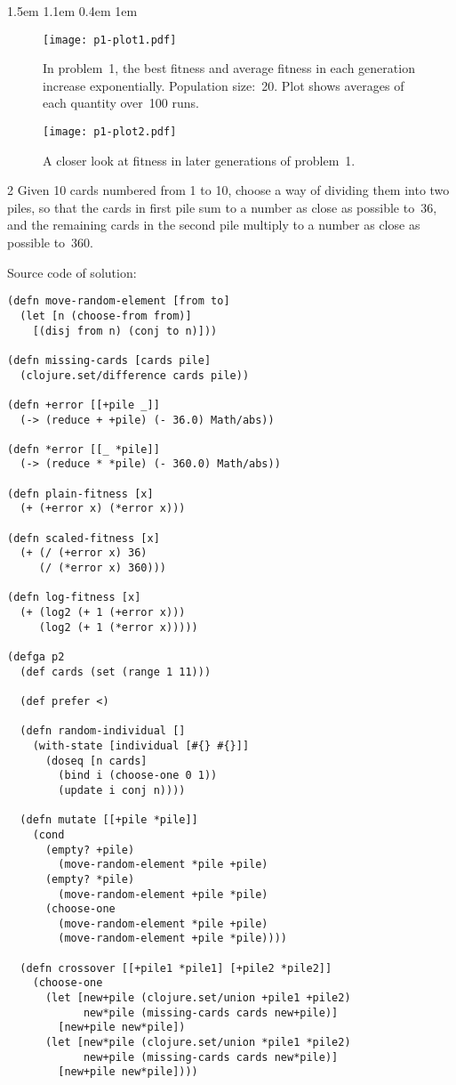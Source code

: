 \documentclass[letterpaper,11pt]{report}
\newenvironment{problems}
  {\begin{list}{}{
    \renewcommand\makelabel[1]{##1.}
    \leftmargin 1.5em
    \labelwidth 1.1em
    \labelsep 0.4em
    \itemsep 1em
  }}
  {\end{list}}
\begin{document}
\begin{problems}
\begin{figure}
  \centering
\texttt{[image: p1-plot1.pdf]}
  \caption{In problem~1, the best fitness and average fitness in
  each generation increase exponentially. Population size:~20. Plot
  shows averages of each quantity over~100 runs.}
\end{figure}

\begin{figure}
\texttt{[image: p1-plot2.pdf]}
  \caption{A closer look at fitness in later generations of problem~1.}
\end{figure}

\item[2]
Given 10 cards numbered from 1 to 10, choose a way of dividing them into two
piles, so that the cards in first pile sum to a number as close as possible
to~36, and the remaining cards in the second pile multiply to a number as
close as possible to~360.

Source code of solution:
\begin{verbatim}
(defn move-random-element [from to]
  (let [n (choose-from from)]
    [(disj from n) (conj to n)]))

(defn missing-cards [cards pile]
  (clojure.set/difference cards pile))

(defn +error [[+pile _]]
  (-> (reduce + +pile) (- 36.0) Math/abs))

(defn *error [[_ *pile]]
  (-> (reduce * *pile) (- 360.0) Math/abs))

(defn plain-fitness [x]
  (+ (+error x) (*error x)))

(defn scaled-fitness [x]
  (+ (/ (+error x) 36)
     (/ (*error x) 360)))

(defn log-fitness [x]
  (+ (log2 (+ 1 (+error x)))
     (log2 (+ 1 (*error x)))))

(defga p2
  (def cards (set (range 1 11)))

  (def prefer <)

  (defn random-individual []
    (with-state [individual [#{} #{}]]
      (doseq [n cards]
        (bind i (choose-one 0 1))
        (update i conj n))))
  
  (defn mutate [[+pile *pile]]
    (cond
      (empty? +pile)
        (move-random-element *pile +pile)
      (empty? *pile)
        (move-random-element +pile *pile)
      (choose-one
        (move-random-element *pile +pile)
        (move-random-element +pile *pile))))

  (defn crossover [[+pile1 *pile1] [+pile2 *pile2]]
    (choose-one
      (let [new+pile (clojure.set/union +pile1 +pile2)
            new*pile (missing-cards cards new+pile)]
        [new+pile new*pile])
      (let [new*pile (clojure.set/union *pile1 *pile2)
            new+pile (missing-cards cards new*pile)]
        [new+pile new*pile])))
  

\end{verbatim}
\end{problems}
\end{document}
